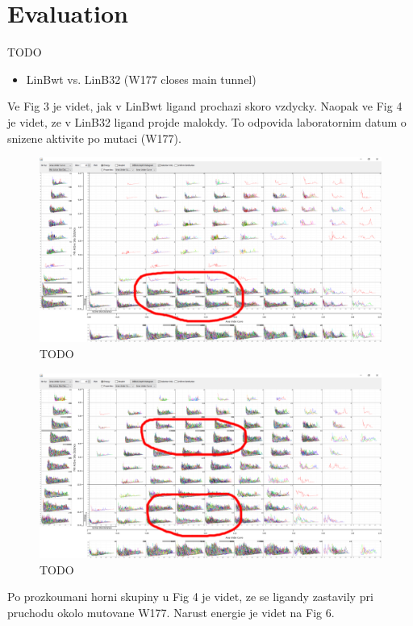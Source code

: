 \documentclass{vgtc}                          %
\begin{document}
\section{Evaluation}

TODO
\begin{itemize}
  \item LinBwt vs. LinB32 (W177 closes main tunnel)
\end{itemize}

Ve Fig 3 je videt, jak v LinBwt ligand prochazi skoro vzdycky.
Naopak ve Fig 4 je videt, ze v LinB32 ligand projde malokdy.
To odpovida laboratornim datum o snizene aktivite po mutaci (W177).

\begin{figure}[h]
  \centering
  \includegraphics[width=\columnwidth]{cs01-linbwt-all}
  \caption{TODO}
\end{figure}

\begin{figure}[h]
  \centering
  \includegraphics[width=\columnwidth]{cs01-linb32-all}
  \caption{TODO}
\end{figure}

Po prozkoumani horni skupiny u Fig 4 je videt, ze se ligandy zastavily pri pruchodu okolo mutovane W177.
Narust energie je videt na Fig 6.
\end{document}
